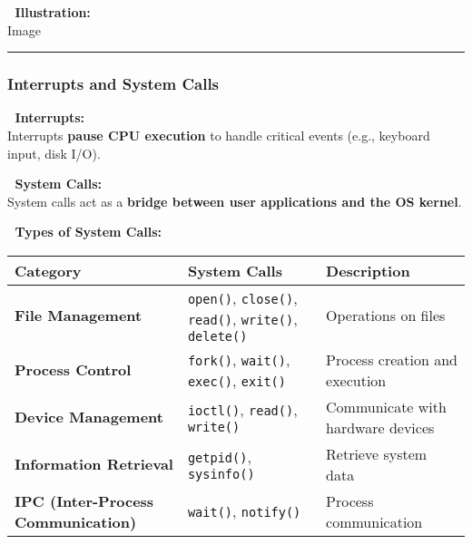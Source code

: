 \documentclass[
]{article}
\begin{document}
📌 \textbf{Illustration:}\\
{Image}

\begin{center}\rule{0.5\linewidth}{0.5pt}\end{center}

\subsubsection{\texorpdfstring{\textbf{Interrupts and System
Calls}}{Interrupts and System Calls}}\label{interrupts-and-system-calls}

📌 \textbf{Interrupts:}\\
Interrupts \textbf{pause CPU execution} to handle critical events (e.g.,
keyboard input, disk I/O).

📌 \textbf{System Calls:}\\
System calls act as a \textbf{bridge between user applications and the
OS kernel}.

📌 \textbf{Types of System Calls:}

\begin{longtable}[]{@{}
  >{\raggedright\arraybackslash}p{}
  >{\raggedright\arraybackslash}p{}
  >{\raggedright\arraybackslash}p{}@{}}
\toprule\noalign{}
\begin{minipage}[b]{\linewidth}\raggedright
\textbf{Category}
\end{minipage} & \begin{minipage}[b]{\linewidth}\raggedright
\textbf{System Calls}
\end{minipage} & \begin{minipage}[b]{\linewidth}\raggedright
\textbf{Description}
\end{minipage} \\
\midrule\noalign{}
\endhead
\bottomrule\noalign{}
\endlastfoot
\textbf{File Management} & \texttt{open()}, \texttt{close()},
\texttt{read()}, \texttt{write()}, \texttt{delete()} & Operations on
files \\
\textbf{Process Control} & \texttt{fork()}, \texttt{wait()},
\texttt{exec()}, \texttt{exit()} & Process creation and execution \\
\textbf{Device Management} & \texttt{ioctl()}, \texttt{read()},
\texttt{write()} & Communicate with hardware devices \\
\textbf{Information Retrieval} & \texttt{getpid()}, \texttt{sysinfo()} &
Retrieve system data \\
\textbf{IPC (Inter-Process Communication)} & \texttt{wait()},
\texttt{notify()} & Process communication \\
\end{longtable}
\end{document}
